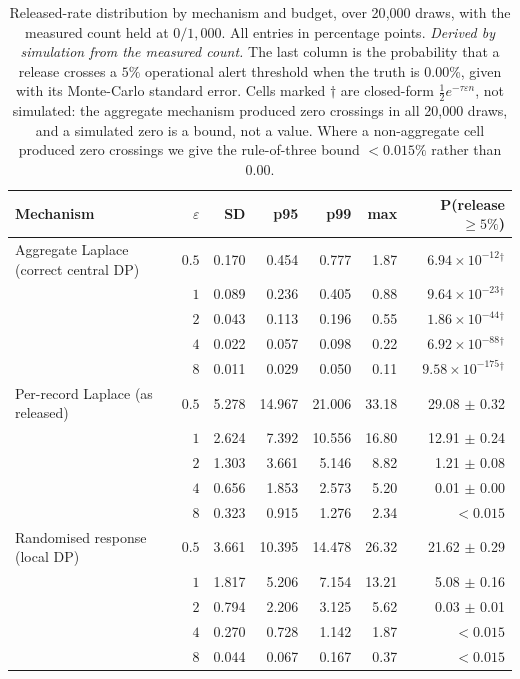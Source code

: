\documentclass[journal]{IEEEtran}
\theoremstyle{definition}
\newcommand{\Nrec}{1{,}000}
\newcommand{\Nrefused}{0}
\newcommand{\Truerate}{0.00}
\newcommand{\Trials}{20{,}000}
\newcommand{\AlarmTau}{5}
\newcommand{\LapAlarmBound}{0.015}
\begin{document}
\begin{table}[t]
\centering
\caption{Released-rate distribution by mechanism and budget, over \Trials{}
draws, with the measured count held at $\Nrefused/\Nrec$. All entries in
percentage points. \emph{Derived by simulation from the measured count.} The last
column is the probability that a release crosses a $\AlarmTau\%$ operational
alert threshold when the truth is \Truerate\%, given with its Monte-Carlo
standard error. Cells marked $\dagger$ are closed-form
$\tfrac{1}{2}e^{-\tau\varepsilon n}$, not simulated: the aggregate mechanism
produced zero crossings in all \Trials{} draws, and a simulated zero is a bound,
not a value. Where a non-aggregate cell produced zero crossings we give the
rule-of-three bound $<\LapAlarmBound\%$ rather than $0.00$.}
\label{tab:mechanisms}
\small
\setlength{\tabcolsep}{4pt}
\begin{tabular}{lrrrrrr}
\toprule
Mechanism & $\varepsilon$ & SD & p95 & p99 & max & P(release $\ge \AlarmTau\%$) \\
\midrule
Aggregate Laplace (correct central DP) & $0.5$ & 0.170 & 0.454 & 0.777 & 1.87 & $6.94\times 10^{-12}$$^{\dagger}$ \\
 & $1$ & 0.089 & 0.236 & 0.405 & 0.88 & $9.64\times 10^{-23}$$^{\dagger}$ \\
 & $2$ & 0.043 & 0.113 & 0.196 & 0.55 & $1.86\times 10^{-44}$$^{\dagger}$ \\
 & $4$ & 0.022 & 0.057 & 0.098 & 0.22 & $6.92\times 10^{-88}$$^{\dagger}$ \\
 & $8$ & 0.011 & 0.029 & 0.050 & 0.11 & $9.58\times 10^{-175}$$^{\dagger}$ \\
\addlinespace
Per-record Laplace (as released) & $0.5$ & 5.278 & 14.967 & 21.006 & 33.18 & 29.08 $\pm$ 0.32 \\
 & $1$ & 2.624 & 7.392 & 10.556 & 16.80 & 12.91 $\pm$ 0.24 \\
 & $2$ & 1.303 & 3.661 & 5.146 & 8.82 & 1.21 $\pm$ 0.08 \\
 & $4$ & 0.656 & 1.853 & 2.573 & 5.20 & 0.01 $\pm$ 0.00 \\
 & $8$ & 0.323 & 0.915 & 1.276 & 2.34 & $<0.015$ \\
\addlinespace
Randomised response (local DP) & $0.5$ & 3.661 & 10.395 & 14.478 & 26.32 & 21.62 $\pm$ 0.29 \\
 & $1$ & 1.817 & 5.206 & 7.154 & 13.21 & 5.08 $\pm$ 0.16 \\
 & $2$ & 0.794 & 2.206 & 3.125 & 5.62 & 0.03 $\pm$ 0.01 \\
 & $4$ & 0.270 & 0.728 & 1.142 & 1.87 & $<0.015$ \\
 & $8$ & 0.044 & 0.067 & 0.167 & 0.37 & $<0.015$ \\
\bottomrule
\end{tabular}
\end{table}
\end{document}
